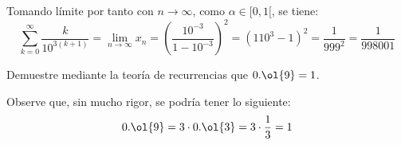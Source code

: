 \begin{ejercicio}
    Tomando límite por tanto con $n\to \infty$, como $\alpha\in [0,1[$, se tiene:
    \begin{equation*}
        \sum_{k=0}^{\infty} \dfrac{k}{10^{3(k+1)}} = \lim_{n\to \infty} x_n
        = \left(\dfrac{10^{-3}}{1-10^{-3}}\right)^2
        = \left({1}{10^3-1}\right)^2
        = \dfrac{1}{999^2} = \dfrac{1}{998001}
    \end{equation*}

\end{ejercicio}



\begin{ejercicio}
    Demuestre mediante la teoría de recurrencias que $0.\ol{9}=1$.
    \begin{observacion}
        Observe que, sin mucho rigor, se podría tener lo siguiente:
        \begin{equation*}
            0.\ol{9} = 3\cdot 0.\ol{3} = 3\cdot \dfrac{1}{3} = 1
        \end{equation*}
    \end{observacion}
\end{ejercicio}

